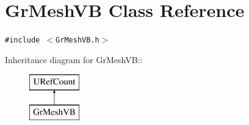 \hypertarget{class_gr_mesh_v_b}{
\section{GrMeshVB Class Reference}
\label{class_gr_mesh_v_b}
}
{\tt \#include $<$GrMeshVB.h$>$}

Inheritance diagram for GrMeshVB::\begin{figure}[H]
\begin{center}
\leavevmode
\includegraphics[height=2cm]{class_gr_mesh_v_b}
\end{center}
\end{figure}
